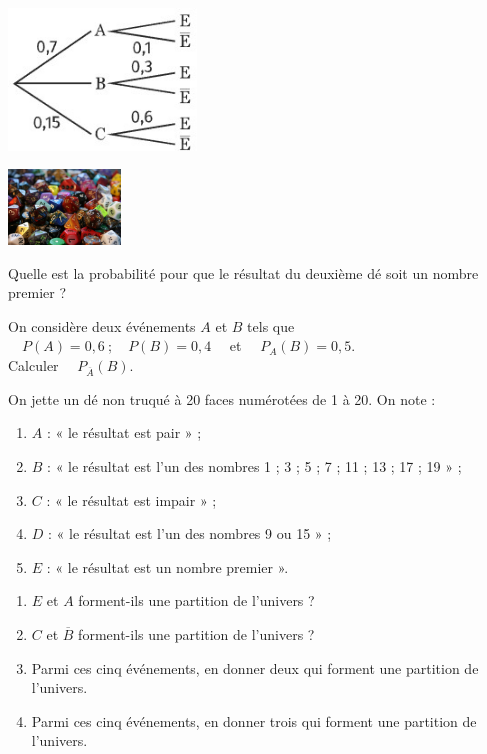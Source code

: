 \documentclass[a4paper,11pt,exos]{nsi} %
\begin{document}
\exo{}
{\includegraphics[width=5cm]{arbre2.jpg}}

\exo{}
{\includegraphics[width=3cm]{dice-568105_640.jpg}}

Quelle est la probabilité pour que le résultat du deuxième dé soit un nombre premier ?


\exo{}
On considère deux événements $A$ et $B$ tels que $\quad P(A)=0,6 \ ; \quad P(B)= 0,4\quad$ et $\quad P_A(B)=0,5$.\\
Calculer $\quad P_{\overline{A}}(B)$.

\exo{}
On jette un dé non truqué à 20 faces numérotées de 1 à 20. On note :
\begin{enumerate}[label=\textbullet]
    \item $A$ : « le résultat est pair » ;
    \item $B$ : « le résultat est l'un des nombres 1 ; 3 ; 5 ; 7 ; 11 ; 13 ; 17 ; 19 » ;
    \item $C$ : « le résultat est impair » ;
    \item $D$ : « le résultat est l'un des nombres 9 ou 15 » ;
    \item $E$ : « le résultat est un nombre premier ».
\end{enumerate}
\begin{enumerate}
    \item $E$ et $A$ forment-ils une partition de l'univers ?
    \item $C$ et $\overline{B}$ forment-ils une partition de l'univers ?
    \item  Parmi ces cinq événements, en donner deux qui forment une partition de l'univers.
    \item Parmi ces cinq événements, en donner trois qui forment une partition de l'univers.
\end{enumerate}
\end{document}
